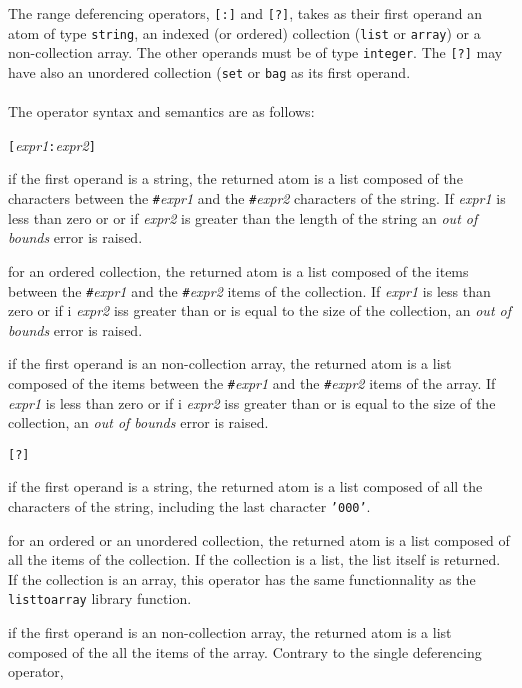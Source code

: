 The range deferencing operators, \texttt{[:]} and \texttt{[?]},
takes as their first operand an atom of type
\texttt{string}, an indexed 
(or ordered) collection (\texttt{list} or \texttt{array})
or a non-collection array. The other operands must be of type \texttt{integer}.
The \texttt{[?]} may have also an unordered collection (\texttt{set}
or \texttt{bag} as its first operand.\\
\\
The operator syntax and semantics are as follows:
\bi
\item \ex\texttt{[}\emph{expr1}\texttt{:}\emph{expr2}\texttt{]}
\be
\item if the first operand is a string,
the returned atom is a list composed of the characters between
the \texttt{\#}\emph{expr1} and the \texttt{\#}\emph{expr2} characters
of the string.
If \emph{expr1} is less than zero or or if \emph{expr2} is greater than the
length of the string an \emph{out of bounds} error is raised.
\item for an ordered collection, the returned atom is a list composed
of the items between the \texttt{\#}\emph{expr1} and the
\texttt{\#}\emph{expr2} items
of the collection. If \emph{expr1} is less than zero or if
i \emph{expr2} iss greater than or is equal to the size of the collection, an
\emph{out of bounds} error is raised.
\item if the first operand is an non-collection array, the returned atom
is a list composed of the items between the \texttt{\#}\emph{expr1} and the
\texttt{\#}\emph{expr2} items of the array.
If \emph{expr1} is less than zero or if
i \emph{expr2} iss greater than or is equal to the size of the collection, an
\emph{out of bounds} error is raised.
\ee
\item \ex\texttt{[?]}
\be
\item if the first operand is a string,
the returned atom is a list composed of all the characters of the
string, including the last character \texttt{'{\bks}000'}.
\item for an ordered or an unordered collection, the returned atom is a list composed
of all the items of the collection. If the collection is a list, the
list itself is returned. If the collection is an array, this operator
has the same functionnality as the \texttt{listtoarray} library function.
\item if the first operand is an non-collection array, the returned atom
is a list composed of the all the items of the array.
\ee
\ei
Contrary to the single deferencing operator,
